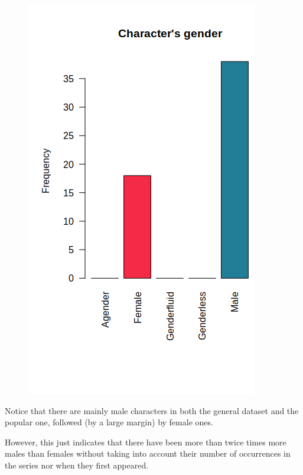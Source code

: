 \begin{figure}[!htb]
\begin{minipage}{0.47\textwidth}
        \includegraphics[width=\linewidth]{img/genders_plot_pop.png}
    \end{minipage}
\end{figure}


  Notice that there are mainly male characters in both the general dataset and the popular one, followed (by a large margin) by female ones. 
  
       However, this just indicates that there have been more than twice times more males than females without taking into account their number of occurrences in the series nor when they first appeared.
       
